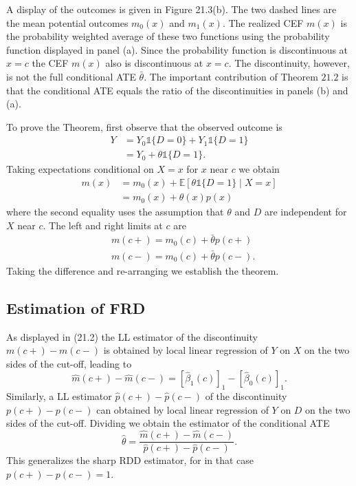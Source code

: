\documentclass[10pt]{article}
\begin{document}
A display of the outcomes is given in Figure 21.3(b). The two dashed lines are the mean potential outcomes $m_{0}(x)$ and $m_{1}(x)$. The realized CEF $m(x)$ is the probability weighted average of these two functions using the probability function displayed in panel (a). Since the probability function is discontinuous at $x=c$ the CEF $m(x)$ also is discontinuous at $x=c$. The discontinuity, however, is not the full conditional ATE $\bar{\theta}$. The important contribution of Theorem $21.2$ is that the conditional ATE equals the ratio of the discontinuities in panels (b) and (a).

To prove the Theorem, first observe that the observed outcome is
$$
\begin{aligned}
Y &=Y_{0} \mathbb{1}\{D=0\}+Y_{1} \mathbb{1}\{D=1\} \\
&=Y_{0}+\theta \mathbb{1}\{D=1\} .
\end{aligned}
$$
Taking expectations conditional on $X=x$ for $x$ near $c$ we obtain
$$
\begin{aligned}
m(x) &=m_{0}(x)+\mathbb{E}[\theta \mathbb{1}\{D=1\} \mid X=x] \\
&=m_{0}(x)+\theta(x) p(x)
\end{aligned}
$$
where the second equality uses the assumption that $\theta$ and $D$ are independent for $X$ near $c$. The left and right limits at $c$ are
$$
\begin{aligned}
&m(c+)=m_{0}(c)+\bar{\theta} p(c+) \\
&m(c-)=m_{0}(c)+\bar{\theta} p(c-) .
\end{aligned}
$$
Taking the difference and re-arranging we establish the theorem.

\subsection{Estimation of FRD}
As displayed in (21.2) the LL estimator of the discontinuity $m(c+)-m(c-)$ is obtained by local linear regression of $Y$ on $X$ on the two sides of the cut-off, leading to
$$
\widehat{m}(c+)-\widehat{m}(c-)=\left[\widehat{\beta}_{1}(c)\right]_{1}-\left[\widehat{\beta}_{0}(c)\right]_{1} .
$$
Similarly, a LL estimator $\hat{p}(c+)-\widehat{p}(c-)$ of the discontinuity $p(c+)-p(c-)$ can obtained by local linear regression of $Y$ on $D$ on the two sides of the cut-off. Dividing we obtain the estimator of the conditional ATE
$$
\widehat{\theta}=\frac{\widehat{m}(c+)-\widehat{m}(c-)}{\widehat{p}(c+)-\widehat{p}(c-)} .
$$
This generalizes the sharp RDD estimator, for in that case $p(c+)-p(c-)=1$.
\end{document}
